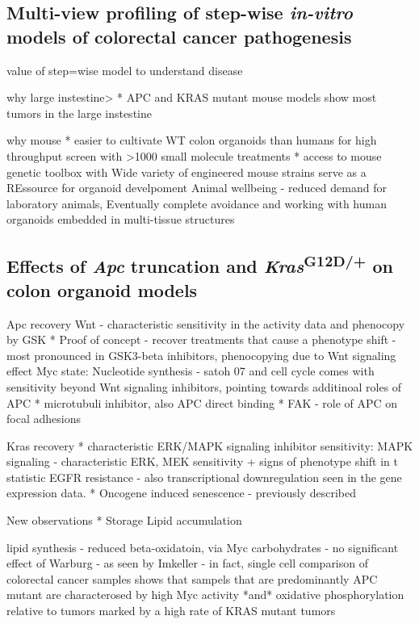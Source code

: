 \begin{flushleft}
\section{Multi-view profiling of step-wise \textit{in-vitro} models of colorectal cancer pathogenesis}

value of step=wise model to understand disease

why large instestine>
* APC and KRAS mutant mouse models show most tumors in the large instestine \citep{luoMutatedRasAsp122009}

why mouse
* easier to cultivate WT colon organoids than humans for high throughput screen with >1000 small molecule treatments
* access to mouse genetic toolbox with Wide variety of engineered mouse strains serve as a REssource for organoid develpoment
Animal wellbeing - reduced demand for laboratory animals, Eventually complete avoidance and working with human organoids embedded in multi-tissue structures

\subsection{Effects of \textit{Apc} truncation and \textit{Kras}\textsuperscript{G12D/+} on colon organoid models}

Apc recovery 
Wnt - characteristic sensitivity in the activity data and phenocopy by GSK * Proof of concept - recover treatments that cause a phenotype shift - most pronounced in GSK3-beta inhibitors, phenocopying due to Wnt signaling effect
Myc state:
Nucleotide synthesis - satoh 07 and cell cycle
comes with sensitivity beyond Wnt signaling inhibitors, pointing towards additinoal roles of APC
* microtubuli inhibitor, also APC direct binding
* FAK - role of APC on focal adhesions
\par

Kras recovery
* characteristic ERK/MAPK signaling inhibitor sensitivity:
MAPK signaling - characteristic ERK, MEK sensitivity + signs of phenotype shift in t statistic
EGFR resistance - also transcriptional downregulation seen in the gene expression data.
* Oncogene induced senescence - previously described
\par


New observations 
* Storage Lipid accumulation

lipid synthesis - reduced beta-oxidatoin, via Myc
carbohydrates - no significant effect of Warburg - as seen by Imkeller  - in fact, single cell comparison of colorectal cancer samples shows that sampels that are predominantly APC mutant are characterosed by high Myc activity *and* oxidative phosphorylation relative to tumors marked by a high rate of KRAS mutant tumors


\end{flushleft}
